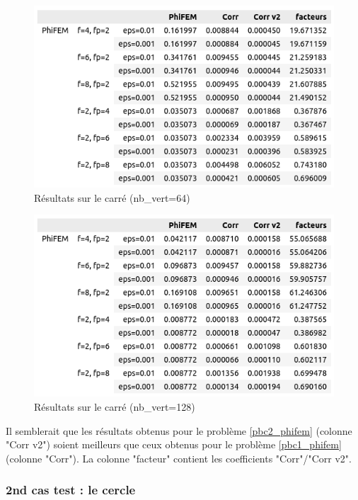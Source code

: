 \documentclass[french]{article}
\begin{document}
	\begin{minipage}{0.48\linewidth}
		\begin{figure}[H]
			\centering
			\includegraphics[width=0.9\linewidth]{phifem_carre_64.png}
			\caption{Résultats sur le carré (nb\_vert=64)}
		\end{figure}
	\end{minipage}
	\begin{minipage}{0.48\linewidth}
		\begin{figure}[H]
			\centering
			\includegraphics[width=0.9\linewidth]{phifem_carre_128.png}
			\caption{Résultats sur le carré (nb\_vert=128)}
		\end{figure}
	\end{minipage}
	
	Il semblerait que les résultats obtenus pour le problème \ref{pbc2_phifem} (colonne "Corr v2") soient meilleurs que ceux obtenus pour le problème \ref{pbc1_phifem} (colonne "Corr"). La colonne "facteur" contient les coefficients "Corr"/"Corr v2".
	
	\subsubsection*{2nd cas test : le cercle}
	
\end{document}
